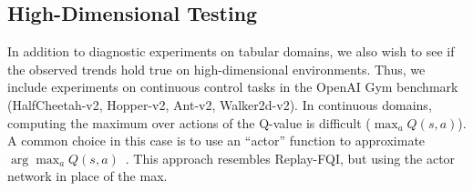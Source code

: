 \subsection{High-Dimensional Testing}

In addition to diagnostic experiments on tabular domains, we also wish to see if the observed trends hold true on high-dimensional environments. Thus, we include experiments on continuous control tasks in the OpenAI Gym benchmark~\citep{gym} (HalfCheetah-v2, Hopper-v2, Ant-v2, Walker2d-v2). In continuous domains, computing the maximum over actions of the Q-value is difficult ($\max_a Q(s,a)$). A common choice in this case is to use an ``actor'' function to approximate $\arg\max_a Q(s,a)$~\cite{Lillicrap2015,pmlr-v80-fujimoto18a,Haarnoja18}. This approach resembles Replay-FQI, but using the actor network in place of the max.
